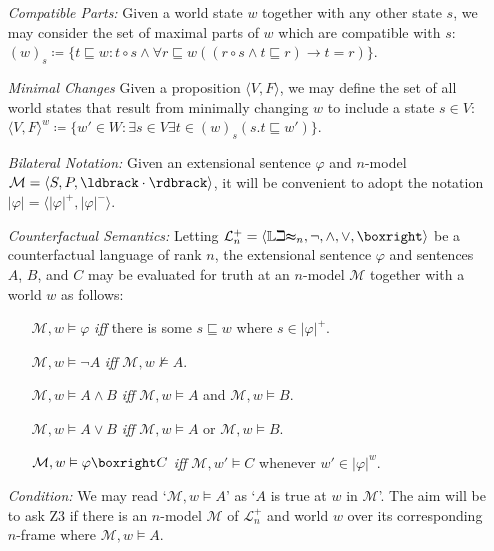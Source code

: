\documentclass[a4paper, 11pt]{article} %
\newcommand{\tuple}[1]{\langle#1\rangle} %
\newcommand{\set}[1]{\lbrace#1\rbrace} %
\newcommand{\Lit}[0]{\mathbb{Lit}}
\newcommand{\M}[0]{\mathcal{M}}
\renewcommand{\L}[0]{\mathcal{L}}
\renewcommand{\Vert}[1]{\ldbrack#1\rdbrack}
\renewcommand{\vert}[1]{\lvert#1\rvert}
\begin{document}
\begin{enumerate}
  \item[\it Compatible Parts:] Given a world state $w$ together with any other state $s$, we may consider the set of maximal parts of $w$ which are compatible with $s$:\\ 
    $(w)_s\coloneq \set{t\sqsubseteq w:t\circ s \wedge \forall r\sqsubseteq w((r\circ s \wedge t \sqsubseteq r) \rightarrow t = r)}$.
  \item[\it Minimal Changes] Given a proposition $\tuple{V,F}$, we may define the set of all world states that result from minimally changing $w$ to include a state $s\in V$:\\ 
      $\tuple{V,F}^w\coloneq \set{w'\in W:\exists s\in V\exists t\in(w)_s(s.t\sqsubseteq w')}$.
  \item[\it Bilateral Notation:] Given an extensional sentence $\varphi$ and $n$-model $\M=\tuple{S,P,\Vert{\cdot}}$, it will be convenient to adopt the notation $\vert{\varphi}=\tuple{\vert{\varphi}^+,\vert{\varphi}^-}$.
  \item[\it Counterfactual Semantics:] Letting $\L_n^+=\tuple{\Lit_n,\neg,\wedge,\vee,\boxright}$ be a counterfactual language of rank $n$, the extensional sentence $\varphi$ and sentences $A$, $B$, and $C$ may be evaluated for truth at an $n$-model $\M$ together with a world $w$ as follows:
    \begin{itemize}
      \item[] $\M, w \vDash \varphi$ \textit{iff} there is some $s \sqsubseteq w$ where $s \in \vert{\varphi}^+$.
      \item[] $\M, w \vDash \neg A$ \textit{iff} $\M, w \nvDash A$.
      \item[] $\M, w \vDash A \wedge B$ \textit{iff} $\M, w \vDash A$ and $\M, w \vDash B$.
      \item[] $\M, w \vDash A \vee B$ \textit{iff} $\M, w \vDash A$ or $\M, w \vDash B$.
      \item[] $\M, w \vDash \varphi\boxright C$ \textit{iff} $\M, w' \vDash C$ whenever $w'\in\vert{\varphi}^w$.
    \end{itemize}
  \item[\it Condition:] We may read `$\M, w \vDash A$' as `$A$ is true at $w$ in $\M$'. 
    The aim will be to ask Z3 if there is an $n$-model $\M$ of $\L_n^+$ and world $w$ over its corresponding $n$-frame where $\M, w \vDash A$.

\end{enumerate}
\end{document}
